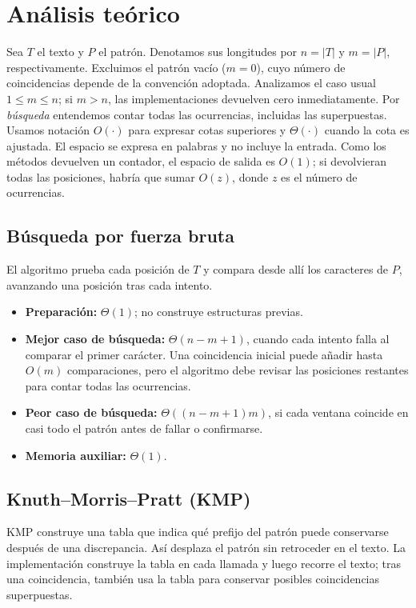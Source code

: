 \section{Análisis teórico}

Sea \(T\) el texto y \(P\) el patrón. Denotamos sus longitudes por
\(n = |T|\) y \(m = |P|\), respectivamente. Excluimos el patrón vacío
(\(m = 0\)), cuyo número de coincidencias depende de la convención adoptada.
Analizamos el caso usual \(1 \leq m \leq n\); si \(m > n\), las implementaciones devuelven cero
inmediatamente. Por \textit{búsqueda} entendemos contar todas las ocurrencias,
incluidas las superpuestas. Usamos notación \(O(\cdot)\) para expresar cotas
superiores y \(\Theta(\cdot)\) cuando la cota es ajustada. El espacio se expresa
en palabras y no incluye la entrada. Como los métodos devuelven un contador, el
espacio de salida es \(O(1)\); si devolvieran todas las posiciones, habría que
sumar \(O(z)\), donde \(z\) es el número de ocurrencias.

\subsection{Búsqueda por fuerza bruta}

El algoritmo prueba cada posición de \(T\) y compara desde allí los caracteres
de \(P\), avanzando una posición tras cada intento.
\begin{itemize}
    \item \textbf{Preparación:} \(\Theta(1)\); no construye estructuras previas.
    \item \textbf{Mejor caso de búsqueda:} \(\Theta(n - m + 1)\), cuando cada
    intento falla al comparar el primer carácter. Una coincidencia inicial puede
    añadir hasta \(O(m)\) comparaciones, pero el algoritmo debe revisar las
    posiciones restantes para contar todas las ocurrencias.
    \item \textbf{Peor caso de búsqueda:} \(\Theta((n - m + 1)m)\), si cada ventana
    coincide en casi todo el patrón antes de fallar o confirmarse.
    \item \textbf{Memoria auxiliar:} \(\Theta(1)\).
\end{itemize}

\subsection{Knuth--Morris--Pratt (KMP)}

KMP construye una tabla que indica qué prefijo del patrón puede conservarse
después de una discrepancia. Así desplaza el patrón sin retroceder en el texto.
La implementación construye la tabla en cada llamada y luego
recorre el texto; tras una coincidencia, también usa la tabla para conservar
posibles coincidencias superpuestas.

